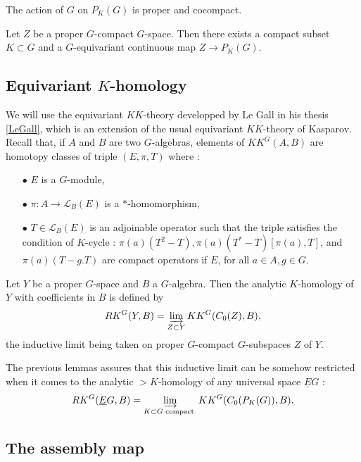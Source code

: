 \begin{lem}
The action of $G$ on $P_K(G)$ is proper and cocompact.
\end{lem}  

\begin{lem}
Let $Z$ be a proper $G$-compact $G$-space. Then there exists a compact subset $K\subset G$ and a $G$-equivariant continuous map $Z\rightarrow P_K(G)$.
\end{lem}  

\subsection{Equivariant $K$-homology}

We will use the equivariant $KK$-theory developped by Le Gall in his thesis \ref{LeGall}, which is an extension of the usual equivariant $KK$-theory of Kasparov. Recall that, if $A$ and $B$ are two $G$-algebras, elements of $KK^G(A,B)$ are homotopy classes of triple $(E,\pi,T)$ where :\\

\begin{itemize}
\item[$\bullet$] $E$ is a $G$-module,
\item[$\bullet$] $\pi : A\rightarrow \mathcal L_B(E)$ is a $*$-homomorphism,
\item[$\bullet$] $T\in \mathcal L_B(E)$ is an adjoinable operator such that the triple satisfies the condition of $K$-cycle : $\pi(a)(T^2-T),\pi(a)(T^*-T)[\pi(a),T]$, and $\pi(a)(T-g.T)$ are compact operators if $E$, for all $a\in A, g\in G$.\\
\end{itemize}

\begin{definition}
Let $Y$ be a proper $G$-space and $B$ a $G$-algebra. Then the analytic $K$-homology of $Y$ with coefficients in $B$ is defined by 
\[RK^G(Y,B) = \varinjlim_{Z\subset Y} KK^G(C_0(Z),B), \]
the inductive limit being taken on proper $G$-compact $G$-subspaces $Z$ of $Y$.
\end{definition}

The previous lemmas assures that this inductive limit can be somehow restricted when it comes to the analytic $>K$-homology of any universal space $\underline E G$ :
\[RK^G(\underline E G,B) = \varinjlim_{K\subset G \text{ compact }} KK^G(C_0(P_K(G)),B).\]


\subsection{The assembly map}

